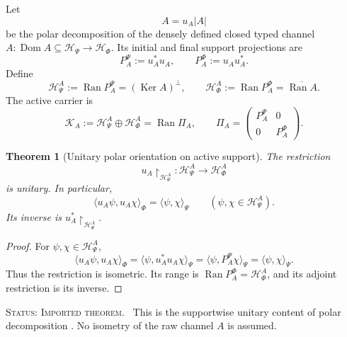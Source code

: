 \documentclass[11pt,reqno]{scrartcl}
\newcommand{\scrHP}{\mathscr H_{\Psi}}
\newcommand{\scrHF}{\mathscr H_{\Phi}}
\newcommand{\polA}{u_A}
\newcommand{\absA}{|A|}
\newcommand{\PiA}{\Pi_{A}}
\newcommand{\inner}[2]{\langle #1,#2\rangle}
\DeclareMathOperator{\Dom}{Dom}
\DeclareMathOperator{\Ran}{Ran}
\DeclareMathOperator{\Ker}{Ker}
\newcommand{\restr}[2]{#1\!\upharpoonright_{#2}}
\newcommand{\statuslabel}[1]{\par\smallskip\noindent\textsc{Status: #1.}\ }
\newcommand{\actHP}{\mathscr H_{\Psi}^{A}}
\newcommand{\actHF}{\mathscr H_{\Phi}^{A}}
\newcommand{\actK}{\mathscr K_{A}}
\newcommand{\suppProjP}{P_{A}^{\Psi}}
\newcommand{\suppProjF}{P_{A}^{\Phi}}
\theoremstyle{plain}
\newtheorem{theorem}{Theorem}[section]
\theoremstyle{definition}
\theoremstyle{remark}
\begin{document}
Let
\begin{equation}
  A=\polA\absA
  \label{eq:active-polar-decomposition}
\end{equation}
be the polar decomposition of the densely defined closed typed channel
\(A:\Dom A\subseteq\scrHP\to\scrHF\).  Its initial and final support
projections are
\begin{equation}
  \suppProjP:=\polA^*\polA,
  \qquad
  \suppProjF:=\polA\polA^*.
  \label{eq:active-support-projections}
\end{equation}
Define
\begin{equation}
  \boxed{
  \actHP:=\Ran\suppProjP=(\Ker A)^\perp,
  \qquad
  \actHF:=\Ran\suppProjF=\overline{\Ran A}.}
  \label{eq:active-support-spaces}
\end{equation}
The active carrier is
\begin{equation}
  \actK:=\actHP\oplus\actHF=\Ran\PiA,
  \qquad
  \PiA=
  \begin{pmatrix}
    \suppProjP&0\\
    0&\suppProjF
  \end{pmatrix}.
  \label{eq:active-carrier}
\end{equation}

\begin{theorem}[Unitary polar orientation on active support]
\label{thm:polar-unitary-active}
The restriction
\begin{equation}
  \restr{\polA}{\actHP}:\actHP\longrightarrow\actHF
  \label{eq:uA-active-unitary-map}
\end{equation}
is unitary.  In particular,
\begin{equation}
  \inner{\polA\psi}{\polA\chi}_{\Phi}
  =\inner{\psi}{\chi}_{\Psi}
  \qquad
  (\psi,\chi\in\actHP).
  \label{eq:uA-active-inner-product}
\end{equation}
Its inverse is \(\restr{\polA^*}{\actHF}\).
\end{theorem}

\begin{proof}
For \(\psi,\chi\in\actHP\),
\begin{equation}
  \inner{\polA\psi}{\polA\chi}_{\Phi}
  =\inner{\psi}{\polA^*\polA\chi}_{\Psi}
  =\inner{\psi}{\suppProjP\chi}_{\Psi}
  =\inner{\psi}{\chi}_{\Psi}.
\end{equation}
Thus the restriction is isometric.  Its range is
\(\Ran\suppProjF=\actHF\), and its adjoint restriction is its inverse.
\end{proof}

\statuslabel{Imported theorem} This is the supportwise unitary content of
polar decomposition \cite{Kato,ReedSimon,TAUM2026}.  No isometry of the raw
channel \(A\) is assumed.
\end{document}
